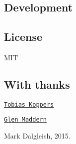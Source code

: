 \subsection*{Development}




\subsection*{License}

M\+IT

\subsection*{With thanks}


\begin{DoxyItemize}
\item \href{https://github.com/sokra}{\tt Tobias Koppers}
\item \href{https://github.com/geelen}{\tt Glen Maddern} 

 Mark Dalgleish, 2015. 
\end{DoxyItemize}